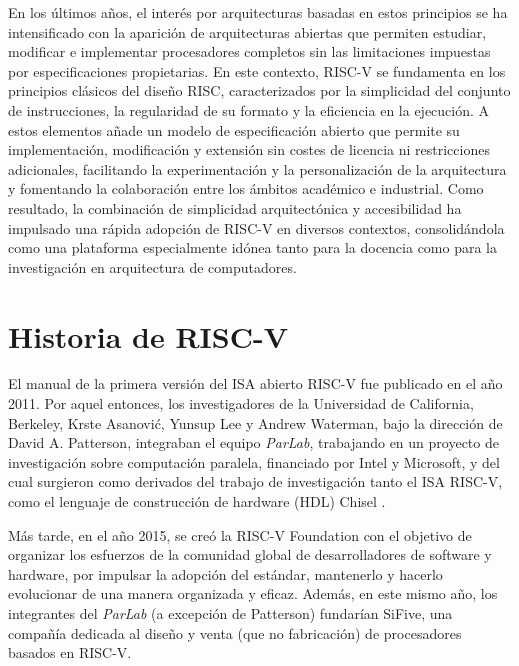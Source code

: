 En los últimos años, el interés por arquitecturas basadas en estos principios se ha intensificado con la aparición de arquitecturas abiertas que permiten estudiar, modificar e implementar procesadores completos sin las limitaciones impuestas por especificaciones propietarias. En este contexto, RISC-V se fundamenta en los principios clásicos del diseño RISC, caracterizados por la simplicidad del conjunto de instrucciones, la regularidad de su formato y la eficiencia en la ejecución. A estos elementos añade un modelo de especificación abierto que permite su implementación, modificación y extensión sin costes de licencia ni restricciones adicionales, facilitando la experimentación y la personalización de la arquitectura y fomentando la colaboración entre los ámbitos académico e industrial. Como resultado, la combinación de simplicidad arquitectónica y accesibilidad ha impulsado una rápida adopción de RISC-V en diversos contextos, consolidándola como una plataforma especialmente idónea tanto para la docencia como para la investigación en arquitectura de computadores.

\section{Historia de RISC-V}

El manual de la primera versión del ISA abierto RISC-V fue publicado en el año 2011\cite{waterman2011risc}. Por aquel entonces, los investigadores de la Universidad de California, Berkeley, Krste Asanović, Yunsup Lee y Andrew Waterman, bajo la dirección de David A. Patterson, integraban el equipo \textit{ParLab}, trabajando en un proyecto de investigación sobre computación paralela, financiado por Intel y Microsoft, y del cual surgieron como derivados del trabajo de investigación tanto el ISA RISC-V, como el lenguaje de construcción de hardware (HDL) Chisel \cite{riscvhistory}.

Más tarde, en el año 2015, se creó la RISC-V Foundation con el objetivo de organizar los esfuerzos de la comunidad global de desarrolladores de software y hardware, por impulsar la adopción del estándar, mantenerlo y hacerlo evolucionar de una manera organizada y eficaz. Además, en este mismo año, los integrantes del \textit{ParLab} (a excepción de Patterson) fundarían SiFive, una compañía dedicada al diseño y venta (que no fabricación) de procesadores basados en RISC-V.

